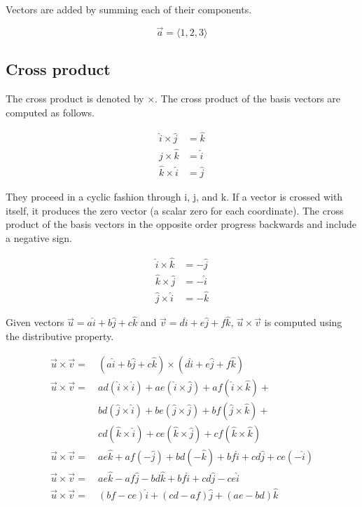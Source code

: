 Vectors are added by summing each of their components.

\begin{equation*}
  \vec{a} = \langle 1, 2, 3 \rangle
\end{equation*}

\subsection{Cross product}

The cross product is denoted by $\times$. The cross product of the basis vectors
are computed as follows.

\begin{align*}
  \hat{i} \times \hat{j} &= \hat{k} \\
  \hat{j} \times \hat{k} &= \hat{i} \\
  \hat{k} \times \hat{i} &= \hat{j}
\end{align*}

They proceed in a cyclic fashion through i, j, and k. If a vector is crossed
with itself, it produces the zero vector (a scalar zero for each coordinate).
The cross product of the basis vectors in the opposite order progress backwards
and include a negative sign.

\begin{align*}
  \hat{i} \times \hat{k} &= -\hat{j} \\
  \hat{k} \times \hat{j} &= -\hat{i} \\
  \hat{j} \times \hat{i} &= -\hat{k}
\end{align*}

Given vectors
$\vec{u} = a\hat{i} + b\hat{j} + c\hat{k}$ and
$\vec{v} = d\hat{i} + e\hat{j} + f\hat{k}$, $\vec{u} \times \vec{v}$ is computed
using the distributive property.

\begin{align*}
  \vec{u} \times \vec{v} =&~(a\hat{i} + b\hat{j} + c\hat{k}) \times
    (d\hat{i} + e\hat{j} + f\hat{k}) \\
  \vec{u} \times \vec{v} =&~ad(\hat{i} \times \hat{i}) + ae(\hat{i} \times
    \hat{j}) + af(\hat{i} \times \hat{k}) + \\
    &~bd(\hat{j} \times \hat{i}) + be(\hat{j} \times \hat{j}) +
    bf(\hat{j} \times \hat{k}) + \\
    &~cd(\hat{k} \times \hat{i}) + ce(\hat{k} \times \hat{j}) +
    cf(\hat{k} \times \hat{k}) \\
  \vec{u} \times \vec{v} =&~ae\hat{k} + af(-\hat{j}) + bd(-\hat{k}) +
    bf\hat{i} + cd\hat{j} + ce(-\hat{i}) \\
  \vec{u} \times \vec{v} =&~ae\hat{k} - af\hat{j} - bd\hat{k} + bf\hat{i} +
    cd\hat{j} - ce\hat{i} \\
  \vec{u} \times \vec{v} =&~(bf - ce)\hat{i} + (cd - af)\hat{j} +
    (ae - bd)\hat{k}
\end{align*}
